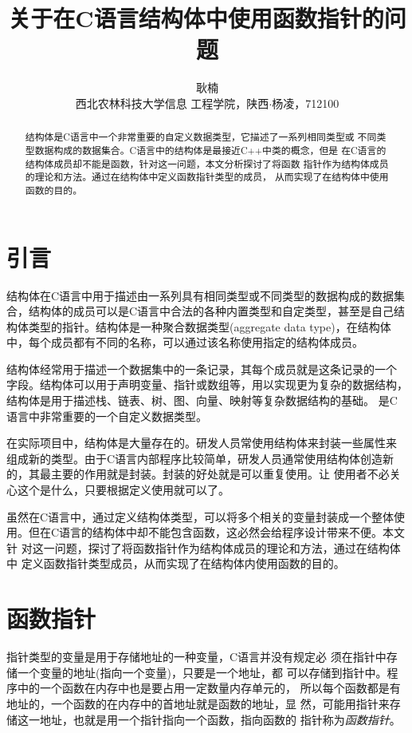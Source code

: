 \documentclass[scheme=chinese, heading = true, UTF8]{ctexart}
\title{\Large \heiti 关于在C语言结构体中使用函数指针的问题}
\author{\zihao{4} \fangsong 耿楠\\\small \songti 西北农林科技大学信息
  工程学院，陕西$\cdot$杨凌，712100}
\begin{document}
\maketitle

\begin{abstract}
  结构体是C语言中一个非常重要的自定义数据类型，它描述了一系列相同类型或
  不同类型数据构成的数据集合。C语言中的结构体是最接近C++中类的概念，但是
  在C语言的结构体成员却不能是函数，针对这一问题，本文分析探讨了将函数
  指针作为结构体成员的理论和方法。通过在结构体中定义函数指针类型的成员，
  从而实现了在结构体中使用函数的目的。
\end{abstract}

\section{引言}\label{sec-intro}
结构体在C语言中用于描述由一系列具有相同类型或不同类型的数据构成的数据集
合，结构体的成员可以是C语言中合法的各种内置类型和自定类型，甚至是自己结
构体类型的指针。结构体是一种聚合数据类型(aggregate data type)，在结构体
中，每个成员都有不同的名称，可以通过该名称使用指定的结构体成员。

结构体经常用于描述一个数据集中的一条记录，其每个成员就是这条记录的一个
字段。结构体可以用于声明变量、指针或数组等，用以实现更为复杂的数据结构，
结构体是用于描述栈、链表、树、图、向量、映射等复杂数据结构的基础。
是C语言中非常重要的一个自定义数据类型。

在实际项目中，结构体是大量存在的。研发人员常使用结构体来封装一些属性来
组成新的类型。由于C语言内部程序比较简单，研发人员通常使用结构体创造新
的，其最主要的作用就是封装。封装的好处就是可以重复使用。让
使用者不必关心这个是什么，只要根据定义使用就可以了。

虽然在C语言中，通过定义结构体类型，可以将多个相关的变量封装成一个整体使
用。但在C语言的结构体中却不能包含函数，这必然会给程序设计带来不便。本文针
对这一问题，探讨了将函数指针作为结构体成员的理论和方法，通过在结构体中
定义函数指针类型成员，从而实现了在结构体内使用函数的目的。
\section{函数指针}\label{sec-funtionpointer}
指针类型的变量是用于存储地址的一种变量，C语言并没有规定必
须在指针中存储一个变量的地址(\alert{指向一个变量})，只要是一个地址，都
可以存储到指针中。程序中的一个函数在内存中也是要占用一定数量内存单元的，
所以每个函数都是有地址的，一个函数的在内存中的首地址就是函数的地址，显
然，可能用指针来存储这一地址，也就是用一个指针指向一个函数，指向函数的
指针称为\emph{函数指针}。
\end{document}
